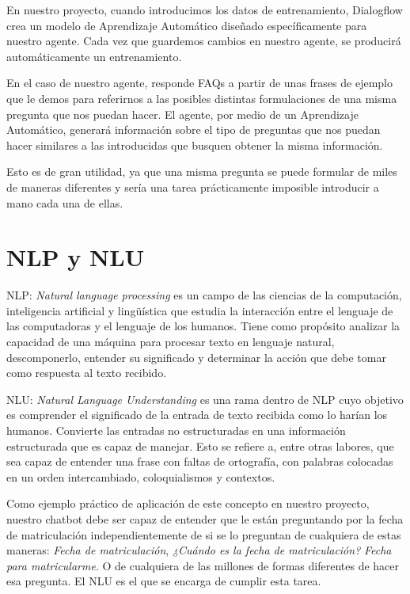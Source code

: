 En nuestro proyecto, cuando introducimos los datos de entrenamiento, Dialogflow crea un modelo de Aprendizaje Automático diseñado específicamente para nuestro agente.
Cada vez que guardemos cambios en nuestro agente, se producirá automáticamente un entrenamiento.

En el caso de nuestro agente, responde FAQs a partir de unas frases de ejemplo que le demos para referirnos a las posibles distintas formulaciones de una misma pregunta que nos puedan hacer. El agente, por medio de un Aprendizaje Automático, generará información sobre el tipo de preguntas que nos puedan hacer similares a las introducidas que busquen obtener la misma información.

Esto es de gran utilidad, ya que una misma pregunta se puede formular de miles de maneras diferentes y sería una tarea prácticamente imposible introducir a mano cada una de ellas.

\newpage

\section{NLP y NLU}

NLP: \textit{Natural language processing} es un campo de las ciencias de la computación, inteligencia artificial y lingüística que estudia la interacción entre el lenguaje de las computadoras y el lenguaje de los humanos. Tiene como propósito analizar la capacidad de una máquina para procesar texto en lenguaje natural, descomponerlo, entender su significado y determinar la acción que debe tomar como respuesta al texto recibido.


NLU: \textit{Natural Language Understanding} es una rama dentro de NLP cuyo objetivo es comprender el significado de la entrada de texto recibida como lo harían los humanos. Convierte las entradas no estructuradas en una información estructurada que es capaz de manejar. Esto se refiere a, entre otras labores, que sea capaz de entender una frase con faltas de ortografía, con palabras colocadas en un orden intercambiado, coloquialismos y contextos.

Como ejemplo práctico de aplicación de este concepto en nuestro proyecto, nuestro chatbot debe ser capaz de entender que le están preguntando por la fecha de matriculación independientemente de si se lo preguntan de cualquiera de estas maneras: \textit{Fecha de matriculación}, \textit{¿Cuándo es la fecha de matriculación?} \textit{Fecha para matricularme}. O de cualquiera de las millones de formas diferentes de hacer esa pregunta. El NLU es el que se encarga de cumplir esta tarea.

